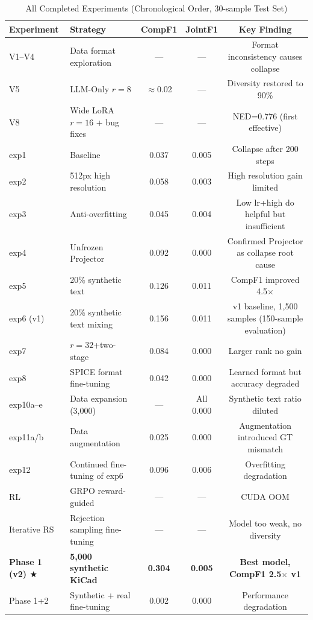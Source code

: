 \begin{table}[h]
\centering
\caption{All Completed Experiments (Chronological Order, 30-sample Test Set)}
\label{tab:all_exp}
\scriptsize
\begin{tabular}{llccc}
\toprule
\textbf{Experiment} & \textbf{Strategy} & \textbf{CompF1} & \textbf{JointF1} & \textbf{Key Finding} \\
\midrule
V1--V4 & Data format exploration & --- & --- & Format inconsistency causes collapse \\
V5 & LLM-Only $r=8$ & $\approx$0.02 & --- & Diversity restored to 90\% \\
V8 & Wide LoRA $r=16$ + bug fixes & --- & --- & NED=0.776 (first effective) \\
exp1 & Baseline & 0.037 & 0.005 & Collapse after 200 steps \\
exp2 & 512px high resolution & 0.058 & 0.003 & High resolution gain limited \\
exp3 & Anti-overfitting & 0.045 & 0.004 & Low lr+high do helpful but insufficient \\
exp4 & Unfrozen Projector & 0.092 & 0.000 & Confirmed Projector as collapse root cause \\
exp5 & 20\% synthetic text & 0.126 & 0.011 & CompF1 improved 4.5$\times$ \\
exp6 (v1) & 20\% synthetic text mixing & 0.156 & 0.011 & v1 baseline, 1,500 samples (150-sample evaluation) \\
exp7 & $r=32$+two-stage & 0.084 & 0.000 & Larger rank no gain \\
exp8 & SPICE format fine-tuning & 0.042 & 0.000 & Learned format but accuracy degraded \\
exp10a--e & Data expansion (3,000) & --- & All 0.000 & Synthetic text ratio diluted \\
exp11a/b & Data augmentation & 0.025 & 0.000 & Augmentation introduced GT mismatch \\
exp12 & Continued fine-tuning of exp6 & 0.096 & 0.006 & Overfitting degradation \\
RL & GRPO reward-guided & --- & --- & CUDA OOM \\
Iterative RS & Rejection sampling fine-tuning & --- & --- & Model too weak, no diversity \\
\textbf{Phase 1 (v2) $\bigstar$} & \textbf{5,000 synthetic KiCad} & \textbf{0.304} & \textbf{0.005} & \textbf{Best model, CompF1 2.5$\times$ v1} \\
Phase 1+2 & Synthetic + real fine-tuning & 0.002 & 0.000 & Performance degradation \\
\bottomrule
\end{tabular}
\end{table}

